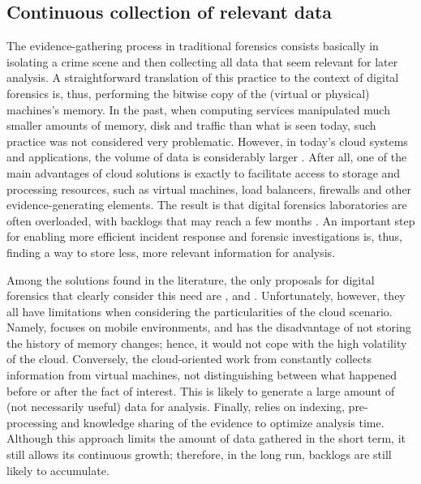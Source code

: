 \documentclass[conference]{IEEEtran}
\begin{document}
\subsection{Continuous collection of relevant data}
\label{sec:related-continuousCollection}


The evidence-gathering process in traditional forensics consists basically in isolating a crime scene and then collecting all data that seem relevant for later analysis.
%
A straightforward translation of this practice to the context of digital forensics is, thus, performing the bitwise copy of the (virtual or physical) machines's memory.
%
In the past, when computing services manipulated much smaller amounts of memory, disk and traffic than what is seen today, such practice was not considered very problematic. 
%
However, in today's cloud systems and applications, the volume of data is considerably larger \cite{Quick_Increase_Volume_Impact:2014}. 
%
After all, one of the main advantages of cloud solutions is exactly to facilitate access to storage and processing resources, such as virtual machines, load balancers, firewalls and other evidence-generating elements.
%
The result is that digital forensics laboratories are often overloaded, with backlogs that may reach a few months \cite{Quick_Increase_Volume_Impact:2014}.
%
An important step for enabling more efficient incident response and forensic investigations is, thus, finding a way to store less, more relevant information for analysis.



Among the solutions found in the literature, the only proposals for digital forensics that clearly consider this need are \cite{Dezfouli_Backup_approach:2012}, \cite{Sang_Log_approach:2013} and \cite{VanBaar_FAAS:2014}.
%
Unfortunately, however, they all have limitations when considering the particularities of the cloud scenario.
%
Namely, \cite{Dezfouli_Backup_approach:2012} focuses on mobile environments, and has the disadvantage of not storing the history of memory changes; hence, it would not cope with the high volatility of the cloud.
%
Conversely, the cloud-oriented work from \cite{Sang_Log_approach:2013} constantly collects information from virtual machines, not distinguishing between what happened before or after the fact of interest. 
%
This is likely to generate a large amount of (not necessarily useful) data for analysis.
%
Finally, \cite{VanBaar_FAAS:2014} relies on indexing, pre-processing and knowledge sharing of the evidence to optimize analysis time.
%
Although this approach limits the amount of data gathered in the short term, it still allows its continuous growth; therefore, in the long run, backlogs are still likely to accumulate.
\end{document}
